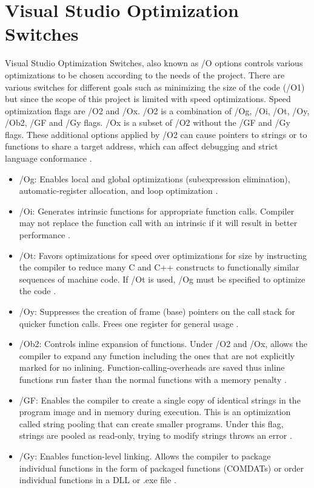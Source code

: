 \documentclass[12pt, oneside]{book}
\theoremstyle{plain}
\theoremstyle{definition}
\begin{document}
\section{Visual Studio Optimization Switches}
Visual Studio Optimization Switches, also known as /O options controls various optimizations to be chosen according to the needs of the project. There are various switches for different goals such as minimizing the size of the code (/O1) but since the scope of this project is limited with speed optimizations. Speed optimization flags are /O2 and /Ox. /O2 is a combination of /Og, /Oi, /Ot, /Oy, /Ob2, /GF and /Gy flags. /Ox is a subset of /O2 without the  /GF and /Gy flags. These additional options applied by /O2 can cause pointers to strings or to functions to share a target address, which can affect debugging and strict language conformance  \cite{vsopt}. 

\begin{itemize}
\item /Og: Enables local and global optimizations (subexpression elimination), automatic-register allocation, and loop optimization \cite{og}. 
\item /Oi: Generates intrinsic functions for appropriate function calls. Compiler may not replace the function call with an intrinsic if it will result in better performance \cite{oi}.
\item /Ot: Favors optimizations for speed over optimizations for size by instructing the compiler to reduce many C and C++ constructs to functionally similar sequences of machine code. If /Ot is used, /Og must be specified to optimize the code \cite{ot}.
\item /Oy: Suppresses the creation of frame (base) pointers on the call stack for quicker function calls.  Frees one register for general usage \cite{oy}.
\item /Ob2: Controls inline expansion of functions. Under /O2 and /Ox, allows the compiler to expand any function including the ones  that are not explicitly marked for no inlining. Function-calling-overheads are saved thus inline functions run faster than the normal functions with a memory penalty \cite{ob}.
\item /GF:  Enables the compiler to create a single copy of identical strings in the program image and in memory during execution. This is an optimization called string pooling that can create smaller programs. Under this flag, strings are pooled as read-only, trying to modify strings throws an error \cite{gf}.
\item /Gy: Enables function-level linking. Allows the compiler to package individual functions in the form of packaged functions  (COMDATs) or order individual functions in a DLL or .exe file \cite{gy}.
\end{itemize}
\end{document}
